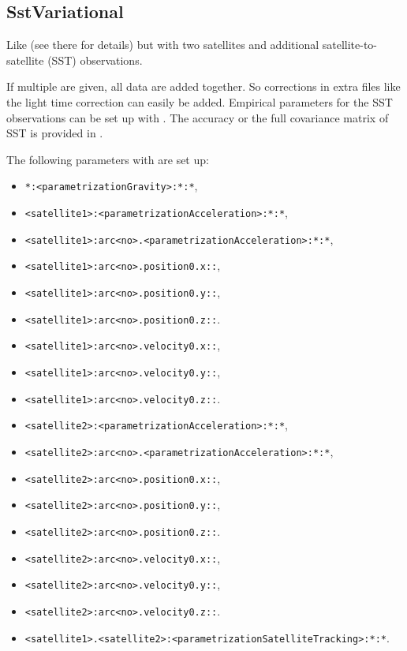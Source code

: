 \subsection{SstVariational}\label{observationType:sstVariational}
Like  (see there for details)
but with two satellites and additional satellite-to-satellite (SST) observations.

If multiple  are given,
all data are added together. So corrections in extra files like the light time correction
can easily be added. Empirical parameters for the SST observations can be set up with
.
The accuracy or the full covariance matrix of SST is provided in
.

The following parameters with  are set up:
\begin{itemize}
\item \verb|*:<parametrizationGravity>:*:*|,
\item \verb|<satellite1>:<parametrizationAcceleration>:*:*|,
\item \verb|<satellite1>:arc<no>.<parametrizationAcceleration>:*:*|,
\item \verb|<satellite1>:arc<no>.position0.x::|,
\item \verb|<satellite1>:arc<no>.position0.y::|,
\item \verb|<satellite1>:arc<no>.position0.z::|.
\item \verb|<satellite1>:arc<no>.velocity0.x::|,
\item \verb|<satellite1>:arc<no>.velocity0.y::|,
\item \verb|<satellite1>:arc<no>.velocity0.z::|.
\item \verb|<satellite2>:<parametrizationAcceleration>:*:*|,
\item \verb|<satellite2>:arc<no>.<parametrizationAcceleration>:*:*|,
\item \verb|<satellite2>:arc<no>.position0.x::|,
\item \verb|<satellite2>:arc<no>.position0.y::|,
\item \verb|<satellite2>:arc<no>.position0.z::|.
\item \verb|<satellite2>:arc<no>.velocity0.x::|,
\item \verb|<satellite2>:arc<no>.velocity0.y::|,
\item \verb|<satellite2>:arc<no>.velocity0.z::|.
\item \verb|<satellite1>.<satellite2>:<parametrizationSatelliteTracking>:*:*|.
\end{itemize}


